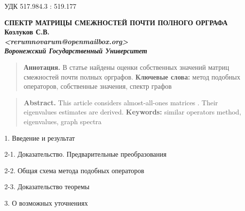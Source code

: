 \documentclass[12pt]{article}
\theoremstyle{definition}
\theoremstyle{plain}
\theoremstyle{remark}
\begin{document}
\setcounter{thm}{0}
\setcounter{lemma}{0}
\quad УДК 517.984.3 : 519.177

\begin{center}
%
\vskip0.5cm
\textbf{СПЕКТР МАТРИЦЫ СМЕЖНОСТЕЙ ПОЧТИ ПОЛНОГО ОРГРАФА}\\
\vskip0.5cm
\textbf{
    \textbf{Козлуков С.В.\footnotemark} \\
    \textit{<rerumnovarum@openmailbox.org>} \\
    \textit{Воронежский Государственный Университет}
}
\end{center}


\begin{quote}
    \small{{\bf Аннотация.}
    В статье найдены оценки собственных значений
    матриц смежностей почти полных орграфов.
    }
    \textbf{Ключевые слова:}
    \small{метод подобных операторов, собственные значения, спектр графов}
\end{quote}

\begin{quote}
    \small{{\bf Abstract.}
    This article considers almost-all-ones matrices
.%
    Their eigenvalues estimates are derived.
    }
    \textbf{Keywords:}
    \small{similar operators method, eigenvalues, graph spectra}
\end{quote}

\begin{center}{1. Введение и результат}\end{center}

\begin{center}{2-1. Доказательство. Предварительные преобразования}\end{center}


\begin{center}{2-2. Общая схема метода подобных операторов}\end{center}

\begin{center}{2-3. Доказательство теоремы}\end{center}

\begin{center}3. О возможных уточнениях\end{center}

\end{document}
